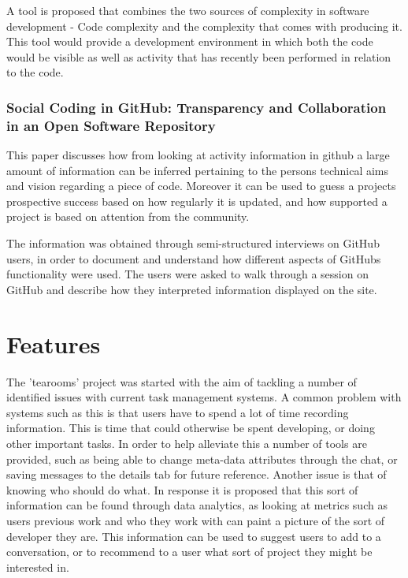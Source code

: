 \documentclass{l4proj}
\begin{document}
A tool is proposed that combines the two sources of complexity in software development - Code complexity and the complexity that comes with producing it.  This tool would provide a development environment in which both the code would be visible as well as activity that has recently been performed in relation to the code.

\subsection {Social Coding in GitHub: Transparency and Collaboration in an Open Software Repository}

This paper discusses how from looking at activity information in github a large amount of information can be inferred pertaining to the persons technical aims and vision regarding a piece of code.  Moreover it can be used to guess a projects prospective success based on how regularly it is updated, and how supported a project is based on attention from the community.

The information was obtained through semi-structured interviews on GitHub users, in order to document and understand how different aspects of GitHubs functionality were used.  The users were asked to walk through a session on GitHub and describe how they interpreted information displayed on the site.


\chapter{Features}

The 'tearooms' project was started with the aim of tackling a number of identified issues with current task management systems. A common problem with systems such as this is that users have to spend a lot of time recording information.  This is time that could otherwise be spent developing, or doing other important tasks.  In order to help alleviate this a number of tools are provided, such as being able to change meta-data attributes through the chat, or saving messages to the details tab for future reference.   Another issue is that of knowing who should do what.  In response it is proposed that this sort of information can be found through data analytics, as looking at metrics such as users previous work and who they work with can paint a picture of the sort of developer they are.  This information can be used to suggest users to add to a conversation, or to recommend to a user what sort of project they might be interested in.
\end{document}
